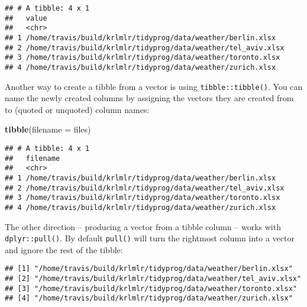 \documentclass[]{book}
\newenvironment{Shaded}{\begin{snugshade}}{\end{snugshade}}
\newcommand{\DataTypeTok}[1]{\textcolor[rgb]{0.13,0.29,0.53}{#1}}
\newcommand{\KeywordTok}[1]{\textcolor[rgb]{0.13,0.29,0.53}{\textbf{#1}}}
\newcommand{\NormalTok}[1]{#1}
\newcommand{\OperatorTok}[1]{\textcolor[rgb]{0.81,0.36,0.00}{\textbf{#1}}}
\newcommand{\StringTok}[1]{\textcolor[rgb]{0.31,0.60,0.02}{#1}}
\begin{document}
\begin{verbatim}
## # A tibble: 4 x 1
##   value                                                        
##   <chr>                                                        
## 1 /home/travis/build/krlmlr/tidyprog/data/weather/berlin.xlsx  
## 2 /home/travis/build/krlmlr/tidyprog/data/weather/tel_aviv.xlsx
## 3 /home/travis/build/krlmlr/tidyprog/data/weather/toronto.xlsx 
## 4 /home/travis/build/krlmlr/tidyprog/data/weather/zurich.xlsx
\end{verbatim}

Another way to create a tibble from a vector is using \texttt{tibble::tibble()}.
You can name the newly created columns by assigning the vectors they are created from to (quoted or unquoted) column names:

\begin{Shaded}
\begin{Highlighting}[]
\KeywordTok{tibble}\NormalTok{(}\DataTypeTok{filename =}\NormalTok{ files)}
\end{Highlighting}
\end{Shaded}

\begin{verbatim}
## # A tibble: 4 x 1
##   filename                                                     
##   <chr>                                                        
## 1 /home/travis/build/krlmlr/tidyprog/data/weather/berlin.xlsx  
## 2 /home/travis/build/krlmlr/tidyprog/data/weather/tel_aviv.xlsx
## 3 /home/travis/build/krlmlr/tidyprog/data/weather/toronto.xlsx 
## 4 /home/travis/build/krlmlr/tidyprog/data/weather/zurich.xlsx
\end{verbatim}

The other direction -- producing a vector from a tibble column -- works with \texttt{dplyr::pull()}.
By default \texttt{pull()} will turn the rightmost column into a vector and ignore the rest of the tibble:

\begin{Shaded}
\end{Shaded}

\begin{verbatim}
## [1] "/home/travis/build/krlmlr/tidyprog/data/weather/berlin.xlsx"  
## [2] "/home/travis/build/krlmlr/tidyprog/data/weather/tel_aviv.xlsx"
## [3] "/home/travis/build/krlmlr/tidyprog/data/weather/toronto.xlsx" 
## [4] "/home/travis/build/krlmlr/tidyprog/data/weather/zurich.xlsx"
\end{verbatim}
\end{document}
